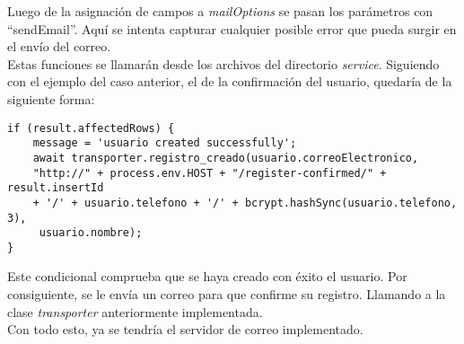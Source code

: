 Luego de la asignación de campos a \textit{mailOptions} se pasan los parámetros con ``sendEmail''. Aquí se intenta capturar cualquier posible error que pueda surgir en el envío del correo.
\vspace{\baselineskip}
\\Estas funciones se llamarán desde los archivos del directorio \textit{service}. Siguiendo con el ejemplo del caso anterior, el de la confirmación del usuario, quedaría de la siguiente forma:
\begin{verbatim}
if (result.affectedRows) {
    message = 'usuario created successfully';
    await transporter.registro_creado(usuario.correoElectronico, 
    "http://" + process.env.HOST + "/register-confirmed/" + result.insertId 
    + '/' + usuario.telefono + '/' + bcrypt.hashSync(usuario.telefono, 3),
     usuario.nombre);
}
\end{verbatim}
Este condicional comprueba que se haya creado con éxito el usuario. Por consiguiente, se le envía un correo para que confirme su registro. Llamando a la clase \textit{transporter} anteriormente implementada.
\\Con todo esto, ya se tendría el servidor de correo implementado.

